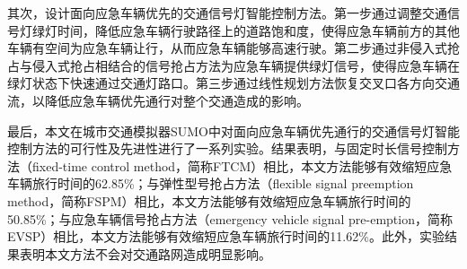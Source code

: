 其次，设计面向应急车辆优先的交通信号灯智能控制方法。第一步通过调整交通信号灯绿灯时间，降低应急车辆行驶路径上的道路饱和度，使得应急车辆前方的其他车辆有空间为应急车辆让行，从而应急车辆能够高速行驶。第二步通过非侵入式抢占与侵入式抢占相结合的信号抢占方法为应急车辆提供绿灯信号，使得应急车辆在绿灯状态下快速通过交通灯路口。第三步通过线性规划方法恢复交叉口各方向交通流，以降低应急车辆优先通行对整个交通造成的影响。

最后，本文在城市交通模拟器SUMO中对面向应急车辆优先通行的交通信号灯智能控制方法的可行性及先进性进行了一系列实验。结果表明，与固定时长信号控制方法（fixed-time control method，简称FTCM）相比，本文方法能够有效缩短应急车辆旅行时间的62.85\%；与弹性型号抢占方法（flexible signal preemption  method，简称FSPM）相比，本文方法能够有效缩短应急车辆旅行时间的50.85\%；与应急车辆信号抢占方法（emergency vehicle signal pre-emption，简称EVSP）相比，本文方法能够有效缩短应急车辆旅行时间的11.62\%。此外，实验结果表明本文方法不会对交通路网造成明显影响。


\hspace{-0.5cm}
